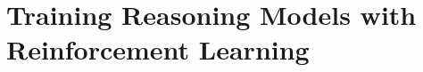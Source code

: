 ﻿%
\chapter{Training Reasoning Models with Reinforcement Learning}
\label{ch:preliminary-results}




